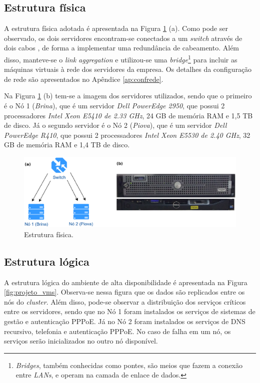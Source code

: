 \subsection{Estrutura física}

A estrutura física adotada é apresentada na Figura \ref{fig:projeto_fisico} (a). Como pode ser observado, os dois servidores encontram-se 
conectados a um \textit{switch} através de dois cabos , de forma a implementar uma redundância de cabeamento. Além disso, manteve-se o 
\textit{link aggregation} e utilizou-se uma \textit{bridge}\footnote[1]{\textit{Bridges}, também conhecidas como pontes, são meios que fazem a 
conexão entre \textit{LANs}, e operam na camada de enlace de dados.} para incluir as máquinas virtuais à rede dos servidores da empresa. 
Os detalhes da configuração de rede são apresentados no Apêndice \ref{ap:confrede}.

Na Figura \ref{fig:projeto_fisico} (b) tem-se a imagem dos servidores utilizados, sendo que o primeiro é o Nó 1 (\textit{Brina}), que é um servidor
\textit{Dell PowerEdge 2950}, que possui 2 processadores \textit{Intel Xeon E5410 de 2.33 GHz}, 24 GB de memória \ac{RAM} e 1,5 TB de disco. 
Já o segundo servidor é o Nó 2 (\textit{Piova}), que é um servidor \textit{Dell PowerEdge R410}, que possui 2 processadores 
\textit{Intel Xeon E5530 de 2.40 GHz}, 32 GB de memória \ac{RAM} e 1,4 TB de disco.

\begin{figure}[h!]
 \centering
 \includegraphics[width=450px]{img/projeto_fisico.eps}
 \caption{Estrutura física.}
 \label{fig:projeto_fisico}
\end{figure}

\subsection{Estrutura lógica}

A estrutura lógica do ambiente de alta disponibilidade é apresentada na Figura \ref{fig:projeto_vms}. Observa-se nessa figura que os dados são
replicados entre os nós do \textit{cluster}. Além disso, pode-se observar a distribuição dos serviços críticos entre os servidores, sendo que 
no Nó 1 foram instalados os serviços de sistemas de gestão e autenticação \ac{PPPoE}. Já no Nó 2 foram instalados os serviços de \ac{DNS} 
recursivo, telefonia e autenticação \ac{PPPoE}. No caso de falha em um nó, os serviços serão inicializados no outro nó disponível. 

